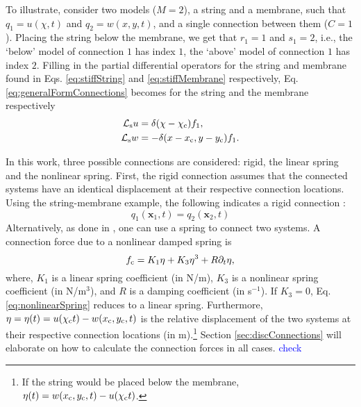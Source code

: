 \documentclass{article}
\def\SWcomment[#1]{\textcolor{blue}{#1}}
\begin{document}
To illustrate, consider two models ($M=2$), a string and a membrane, such that $q_1 = u(\chi ,t)$ and $q_2 = w(x,y,t)$, and a single connection between them ($C = 1$). Placing the string below the membrane, we get that $r_1 = 1$ and $s_1 = 2$, i.e., the `below' model of connection $1$ has index $1$, the `above' model of connection $1$ has index $2$. Filling in the partial differential operators for the string and membrane found in Eqs. \eqref{eq:stiffString} and \eqref{eq:stiffMembrane} respectively, Eq. \eqref{eq:generalFormConnections} becomes for the string and the membrane respectively
\begin{subequations}
\begin{align}\label{eq:contStringMembraneConn}
        \mathcal{L}_{\text{s}} u &= \delta(\chi - \chi_{\text{c}})f_1,\\
        \mathcal{L}_{\text{s}} w &= -\delta(x - x_{\text{c}}, y-y_{\text{c}})f_1.
\end{align}
\end{subequations}

In this work, three possible connections are considered: rigid, the linear spring and the nonlinear spring. First, the rigid connection assumes that the connected systems have an identical displacement at their respective connection locations. Using the string-membrane example, the following indicates a rigid connection \cite{theBible}: 
\begin{equation}
    q_1(\boldsymbol{x}_1, t) = q_2(\boldsymbol{x}_2, t)
\end{equation}
Alternatively, as done in \cite{theBible, Bilbao2009Modular}, one can use a spring to connect two systems. A connection force due to a nonlinear damped spring is
\begin{equation}\label{eq:nonlinearSpring}
    f_{\text{c}} = K_1\eta + K_3\eta^3 + R\partial_t \eta,
\end{equation}
where, $K_1$ is a linear spring coefficient (in N/m), $K_3$ is a nonlinear spring coefficient (in N/m$^3$), and $R$ is a damping coefficient (in s$^{-1}$). If $K_3 = 0$, Eq. \eqref{eq:nonlinearSpring} reduces to a linear spring. Furthermore, $\eta = \eta(t) = u(\chi_{\text{c}} t) - w(x_{\text{c}}, y_{\text{c}}, t)$ is the relative displacement of the two systems at their respective connection locations (in m).\footnote{If the string would be placed below the membrane, $\eta(t) = w(x_{\text{c}}, y_{\text{c}}, t) - u(\chi_{\text{c}} t)$.} Section \ref{sec:discConnections} will elaborate on how to calculate the connection forces in all cases. \SWcomment[check]
\end{document}
